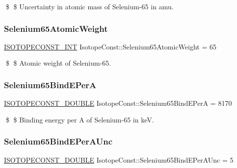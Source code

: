 \$ \$ Uncertainty in atomic mass of Selenium-\/65 in amu. \mbox{\label{group___isotope_const-_selenium-_se65_gaf16c37d1c383cf4af56d69a584c9cbbd}} 
\subsubsection{\texorpdfstring{Selenium65\+Atomic\+Weight}{Selenium65AtomicWeight}}
{\footnotesize\ttfamily \mbox{\hyperlink{group___isotope_const-_macros_ga5f18360b3e99483a35c32d789e62621c}{I\+S\+O\+T\+O\+P\+E\+C\+O\+N\+S\+T\+\_\+\+I\+NT}} Isotope\+Const\+::\+Selenium65\+Atomic\+Weight = 65}

\$ \$ Atomic weight of Selenium-\/65. \mbox{\label{group___isotope_const-_selenium-_se65_gac05fcb4e7cf11d8c3f4234f0c5af98f2}} 
\subsubsection{\texorpdfstring{Selenium65\+Bind\+E\+PerA}{Selenium65BindEPerA}}
{\footnotesize\ttfamily \mbox{\hyperlink{group___isotope_const-_macros_ga8f45a7272ce02c0b4c65c44636ed719a}{I\+S\+O\+T\+O\+P\+E\+C\+O\+N\+S\+T\+\_\+\+D\+O\+U\+B\+LE}} Isotope\+Const\+::\+Selenium65\+Bind\+E\+PerA = 8170}

\$ \$ Binding energy per A of Selenium-\/65 in keV. \mbox{\label{group___isotope_const-_selenium-_se65_ga02de16665d8e4bb82a448fd50fa28c8d}} 
\subsubsection{\texorpdfstring{Selenium65\+Bind\+E\+Per\+A\+Unc}{Selenium65BindEPerAUnc}}
{\footnotesize\ttfamily \mbox{\hyperlink{group___isotope_const-_macros_ga8f45a7272ce02c0b4c65c44636ed719a}{I\+S\+O\+T\+O\+P\+E\+C\+O\+N\+S\+T\+\_\+\+D\+O\+U\+B\+LE}} Isotope\+Const\+::\+Selenium65\+Bind\+E\+Per\+A\+Unc = 5}

